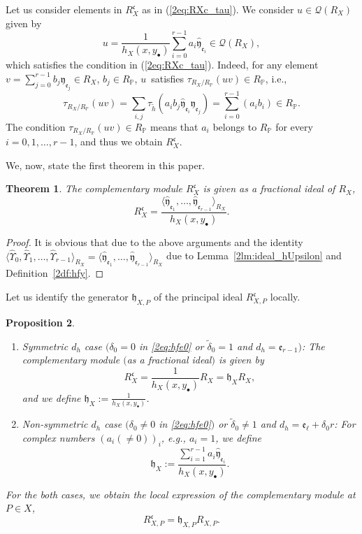 \documentclass[pdftex]{sigma}
\def\PP{{\mathbb P}}
\def\cQ{{\mathcal Q}}
\def\fc{{\mathfrak c}}
\def\fe{{\mathfrak e}}
\def\fh{{\mathfrak h}}
\def\fy{{\mathfrak y}}
\def\th{{\widetilde h}}
\def\tdelta{{\widetilde \delta}}
\def\hfy{{\widehat{\mathfrak y}}}
\def\hUpsilon{{\widehat \Upsilon}}
\numberwithin{equation}{section}
\newtheorem{Theorem}{Theorem}[section]
\newtheorem{Proposition}[Theorem]{Proposition}
 { \theoremstyle{definition}
\newtheorem{Definition}[Theorem]{Definition}
\newtheorem{Note}[Theorem]{Note}
\newtheorem{Example}[Theorem]{Example}
\newtheorem{Remark}[Theorem]{Remark} }
\begin{document}
Let us consider elements in $R_{X}^{\fc}$ as in (\ref{2eq:RXc_tau}).
We consider $u \in \cQ(R_X)$ given by
\begin{equation*}
u = \frac{1}{h_X(x, y_\bullet)} \sum_{i=0}^{r-1} a_i
 \hfy_{\fe_i}\in \cQ(R_X),%
\end{equation*}
which satisfies the condition in (\ref{2eq:RXc_tau}).
Indeed, for any element $v = \sum_{j=0}^{r-1} b_j \fy_{\fe_j}\in R_X$, $b_j \in R_\PP$, $u$~satisfies $\tau_{R_X/R_\PP}(u v) \in R_\PP$, i.e.,
\[
\tau_{R_X/R_\PP}(u v)= \sum_{i,j}
 \tau_\th(a_i b_j \hfy_{\fe_i} \fy_{\fe_j})=
\sum_{i=0}^{r-1}(a_{i} b_{i})\in R_\PP.
\]
The condition $\tau_{R_X/R_\PP}(u v) \in R_\PP$ means that $a_i$ belongs to $R_\PP$ for every $i=0, 1, \dots, r-1$, and thus we obtain $R_{X}^\fc$.

We, now, state the first theorem in this paper.

\begin{Theorem}\label{2pr:R_Xfc}
The complementary module $R_X^\fc$ is given as a fractional ideal of $R_X$,
\[
R_X^\fc=\frac{\langle\hfy_{\fe_1}, \dots, \hfy_{\fe_{r-1}}\rangle_{R_X}}{h_X(x,y_\bullet)}.
\]
\end{Theorem}

\begin{proof}
It is obvious that due to the above arguments and the identity $\big\langle \hUpsilon_{0}, \hUpsilon_{1}, \dots, \hUpsilon_{r-1}\big\rangle_{R_X}=\big\langle\hfy_{\fe_1}, \dots, \hfy_{\fe_{r-1}}\big\rangle_{R_X} $ due to Lemma~\ref{2lm:ideal_hUpsilon} and Definition~\ref{2df:hfy}.
\end{proof}

Let us identify the generator $\fh_{X,P}$ of the principal ideal $R_{X,P}^\fc$ locally.

\begin{Proposition}\label{2pr:d_hcases}\quad
\begin{enumerate}\itemsep=0pt

\item[$1.$] Symmetric $d_h$ case $(\delta_0 = 0$ in \eqref{2eq:hfe0} or $\tdelta_0=1$ and $d_h = \fe_{r-1})$:
The complementary module $($as a fractional ideal$)$ is given by
\begin{equation}
R_X^\fc=\frac{1}{h_X(x,y_\bullet)} R_X= \fh_X R_X,\label{2eq:R_X^fc1}
\end{equation}
and we define $\fh_X:=\frac{1}{h_X(x,y_\bullet)}$.

\item[$2.$] Non-symmetric $d_h$ case $(\delta_0 \neq 0$ in \eqref{2eq:hfe0}$)$ or $\tdelta_0\neq 1$ and $d_h = \fe_{\ell}+\delta_0 r$:
For complex numbers $(a_i(\neq 0))_i$, e.g., $a_i=1$, we define
\begin{equation*}
\fh_X:=\frac{\sum_{i=1}^{r-1}a_i \hfy_{\fe_i}}{h_X(x,y_\bullet)}.
\end{equation*}
\end{enumerate}
For the both cases, we obtain the local expression of the complementary module at $P\in X$,
\begin{equation}
R_{X,P}^\fc= \fh_{X,P} R_{X,P}.
\label{2eq:R_X^fc2}
\end{equation}
\end{Proposition}
\end{document}
